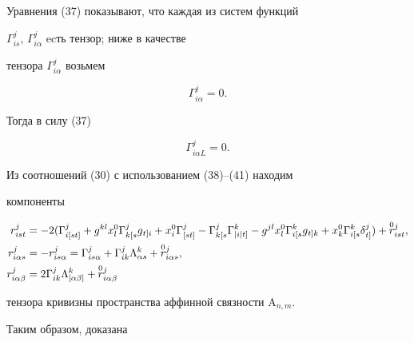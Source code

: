  


Уравнения (37) показывают, что каждая из систем функций 


$\Gamma^j_{is}$, $\Gamma^j_{i\alpha}$ ecть тензор; ниже в качестве 


тензора $\Gamma^j_{i\alpha}$ возьмем 


\begin{equation} 


\Gamma^j_{i\alpha}=0. 


\end{equation} 


Тогда в силу (37) 


\begin{equation} 


\Gamma^j_{i\alpha L}=0. 


\end{equation} 


 


Из соотношений (30) с использованием (38)--(41) находим 


компоненты 


\begin{align} 


r^j_{is t}&=-2(\Gamma^j_{i[s t]}+g^{k l}x^0_l 


\Gamma{}^j_{k[s}g{}_{t]i}+x^0_i \Gamma^j_{[s t]}-


\Gamma{}^j_{k[s}\Gamma{}^k_{|i|t]}-g^{j l}x^0_l 


\Gamma{}^k_{i[s}g{}_{t]k}+x^0_k \Gamma{}^k_{i[s} 


\delta{}^j_{t]})+\up{0}{r}^j_{is t}, \\ 


% 


r^j_{i\alpha s}&=-r^j_{is\alpha}=\Gamma^j_{is\alpha}+ 


\Gamma^j_{i k}\Lambda^k_{\alpha s}+\up{0}{r}^j_{i\alpha s},\\ 


r^j_{i\alpha\beta}&=2\Gamma^j_{i k}\Lambda^k_{[\alpha\beta]}+ 


\up{0}{r}^j_{i\alpha\beta} 


\end{align} 


тензора кривизны пространства аффинной связности $\mathrm A_{n,m}$. 


 


Таким образом, доказана 


